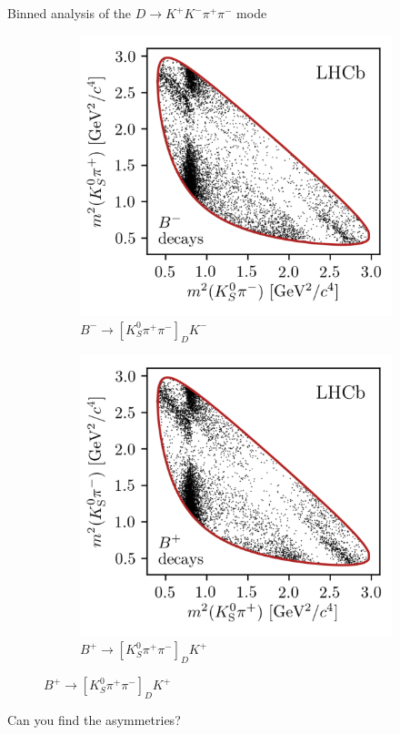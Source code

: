 \documentclass{beamer}
\begin{document}
\begin{frame}{Binned analysis of the $D\to K^+K^-\pi^+\pi^-$ mode}
  \begin{figure}
    \begin{subfigure}{0.5\textwidth}
      \includegraphics[width = 1.0\textwidth]{Plots/KSpipi_Minus_Dalitz.png}
      \caption*{$B^-\to[K_S^0\pi^+\pi^-]_DK^-$}
    \end{subfigure}%
    \begin{subfigure}{0.5\textwidth}
      \includegraphics[width = 1.0\textwidth]{Plots/KSpipi_Plus_Dalitz.png}
      \caption*{$B^+\to[K_S^0\pi^+\pi^-]_DK^+$}
    \end{subfigure}
  \end{figure}
  \begin{center}
    \Large Can you find the asymmetries?
  \end{center}
\end{frame}
\end{document}
